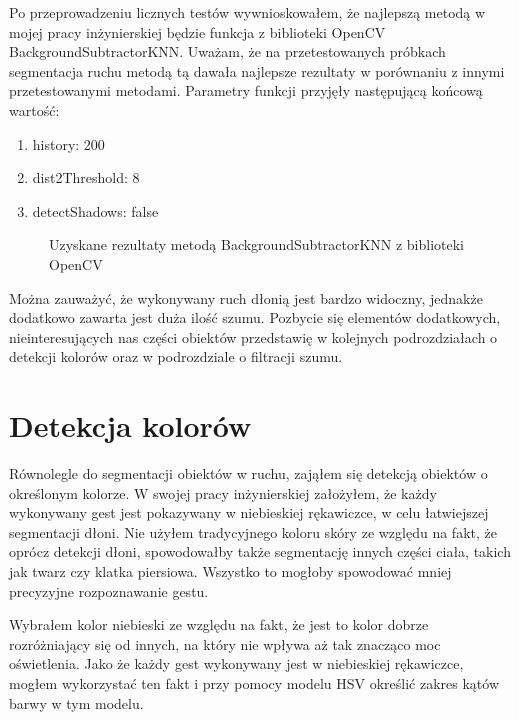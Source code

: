 \documentclass[a4paper,12pt,twoside,openany]{report}
\newcommand{\ImgPath}{.}
\begin{document}
Po przeprowadzeniu licznych testów wywnioskowałem, że najlepszą metodą w mojej pracy inżynierskiej będzie funkcja z biblioteki OpenCV BackgroundSubtractorKNN. Uważam, że na przetestowanych próbkach segmentacja ruchu metodą tą dawała najlepsze rezultaty w porównaniu z innymi przetestowanymi metodami. Parametry funkcji przyjęły następującą końcową wartość:
\begin{enumerate}
	\item history: 200
	\item dist2Threshold: 8
	\item detectShadows: false
\end{enumerate}

\begin{figure}[H]
	\centering
	\caption{Uzyskane rezultaty metodą BackgroundSubtractorKNN z biblioteki OpenCV}
\end{figure}


Można zauważyć, że wykonywany ruch dłonią jest bardzo widoczny, jednakże dodatkowo zawarta jest duża ilość szumu. Pozbycie się elementów dodatkowych, nieinteresujących nas części obiektów przedstawię w kolejnych podrozdziałach o detekcji kolorów oraz w podrozdziale o filtracji szumu. 

\section{Detekcja kolorów}
Równolegle do segmentacji obiektów w ruchu, zająłem się detekcją obiektów o określonym kolorze. W swojej pracy inżynierskiej założyłem, że każdy wykonywany gest jest pokazywany w niebieskiej rękawiczce, w celu łatwiejszej segmentacji dłoni. Nie użyłem tradycyjnego koloru skóry ze względu na fakt, że oprócz detekcji dłoni, spowodowałby także segmentację innych części ciała, takich jak twarz czy klatka piersiowa. Wszystko to mogłoby spowodować mniej precyzyjne rozpoznawanie gestu.

Wybrałem kolor niebieski ze względu na fakt, że jest to kolor dobrze rozróżniający się od innych, na który nie wpływa aż tak znacząco moc oświetlenia.
Jako że każdy gest wykonywany jest w niebieskiej rękawiczce, mogłem wykorzystać ten fakt i przy pomocy modelu HSV określić zakres kątów barwy w tym modelu. 
\end{document}
